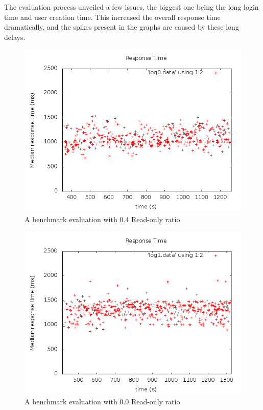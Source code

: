 The evaluation process unveiled a few issues, the biggest one being the long login time and user creation time. This increased the overall response time dramatically, and the spikes present in the graphs are caused by these long delays. 

\begin{figure}[ht]
  \centering %
  \includegraphics[scale=0.5]{src/img/out0.png}
  \caption{A benchmark evaluation with 0.4 Read-only ratio}
\label{figure:graph0}
\end{figure}

\begin{figure}[ht]
  \centering %
  \includegraphics[scale=0.5]{src/img/out1.png}
  \caption{A benchmark evaluation with 0.0 Read-only ratio}
\label{figure:graph1}
\end{figure}

